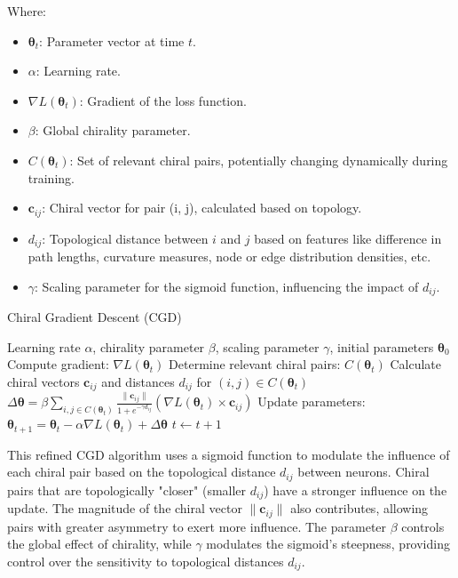 \documentclass[12pt, a4paper]{article}
\begin{document}
Where:

\begin{itemize}
    \item \(\boldsymbol{\theta}_t\): Parameter vector at time \(t\).
    \item \(\alpha\): Learning rate.
    \item \(\nabla L(\boldsymbol{\theta}_t)\): Gradient of the loss function.
    \item \(\beta\): Global chirality parameter.
    \item \(C(\boldsymbol{\theta}_t)\): Set of relevant chiral pairs, potentially changing dynamically during training.
    \item \(\mathbf{c}_{ij}\): Chiral vector for pair (i, j), calculated based on topology.
    \item \(d_{ij}\): Topological distance between \(i\) and \(j\) based on features like difference in path lengths, curvature measures, node or edge distribution densities, etc.
    \item \(\gamma\): Scaling parameter for the sigmoid function, influencing the impact of \(d_{ij}\).
\end{itemize}

\begin{algorithm}
\caption{Chiral Gradient Descent (CGD)}
\label{alg:cgd}
\begin{algorithmic}
\Require Learning rate \(\alpha\), chirality parameter \(\beta\), scaling parameter \(\gamma\), initial parameters \(\boldsymbol{\theta}_0\)
    \State Compute gradient: \(\nabla L(\boldsymbol{\theta}_t)\)
    \State Determine relevant chiral pairs: \(C(\boldsymbol{\theta}_t)\)
    \State Calculate chiral vectors \(\mathbf{c}_{ij}\) and distances \(d_{ij}\) for \((i, j) \in C(\boldsymbol{\theta}_t)\)
    \State \(\Delta \boldsymbol{\theta} =  \beta \sum_{i,j \in C(\boldsymbol{\theta}_t)} \frac{\| \mathbf{c}_{ij} \|}{1 + e^{-\gamma d_{ij}}} (\nabla L(\boldsymbol{\theta}_t) \times \mathbf{c}_{ij})\)
    \State Update parameters: \(\boldsymbol{\theta}_{t+1} = \boldsymbol{\theta}_t - \alpha \nabla L(\boldsymbol{\theta}_t) + \Delta \boldsymbol{\theta}\)
    \State \(t \gets t + 1\)
\EndWhile
\end{algorithmic}
\end{algorithm}

This refined CGD algorithm uses a sigmoid function to modulate the influence of each chiral pair based on the topological distance \(d_{ij}\) between neurons. Chiral pairs that are topologically "closer" (smaller \(d_{ij}\)) have a stronger influence on the update. The magnitude of the chiral vector \(\| \mathbf{c}_{ij} \|\) also contributes, allowing pairs with greater asymmetry to exert more influence. The parameter \(\beta\) controls the global effect of chirality, while \(\gamma\) modulates the sigmoid's steepness, providing control over the sensitivity to topological distances \(d_{ij}\).
\end{document}
